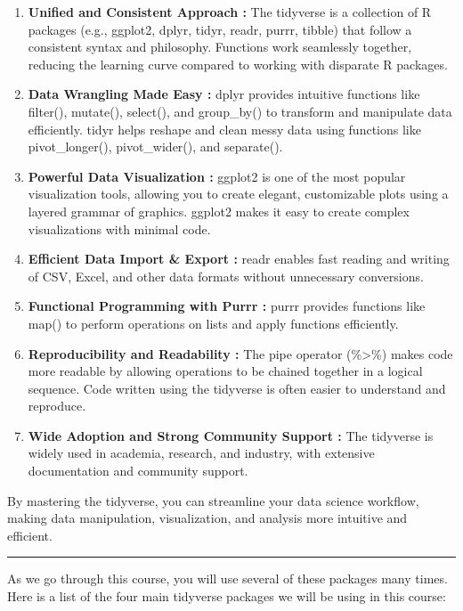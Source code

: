 \documentclass[
  letterpaper,
  DIV=11,
  numbers=noendperiod]{scrreprt}
\begin{document}
\begin{enumerate}
\def\labelenumi{\arabic{enumi}.}
\item
  \textbf{Unified and Consistent Approach :} The tidyverse is a
  collection of R packages (e.g., ggplot2, dplyr, tidyr, readr, purrr,
  tibble) that follow a consistent syntax and philosophy. Functions work
  seamlessly together, reducing the learning curve compared to working
  with disparate R packages.
\item
  \textbf{Data Wrangling Made Easy :} dplyr provides intuitive functions
  like filter(), mutate(), select(), and group\_by() to transform and
  manipulate data efficiently. tidyr helps reshape and clean messy data
  using functions like pivot\_longer(), pivot\_wider(), and separate().
\item
  \textbf{Powerful Data Visualization :} ggplot2 is one of the most
  popular visualization tools, allowing you to create elegant,
  customizable plots using a layered grammar of graphics. ggplot2 makes
  it easy to create complex visualizations with minimal code.
\item
  \textbf{Efficient Data Import \& Export :} readr enables fast reading
  and writing of CSV, Excel, and other data formats without unnecessary
  conversions.
\item
  \textbf{Functional Programming with Purrr :} purrr provides functions
  like map() to perform operations on lists and apply functions
  efficiently.
\item
  \textbf{Reproducibility and Readability :} The pipe operator
  (\%\textgreater\%) makes code more readable by allowing operations to
  be chained together in a logical sequence. Code written using the
  tidyverse is often easier to understand and reproduce.
\item
  \textbf{Wide Adoption and Strong Community Support :} The tidyverse is
  widely used in academia, research, and industry, with extensive
  documentation and community support.
\end{enumerate}

By mastering the tidyverse, you can streamline your data science
workflow, making data manipulation, visualization, and analysis more
intuitive and efficient.

\begin{center}\rule{0.5\linewidth}{0.5pt}\end{center}

As we go through this course, you will use several of these packages
many times. Here is a list of the four main tidyverse packages we will
be using in this course:
\end{document}
